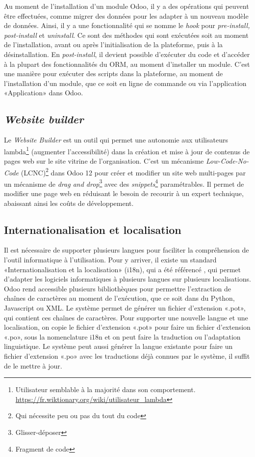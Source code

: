 Au moment de l’installation d’un module Odoo, il y a des opérations qui peuvent être effectuées, comme migrer des données pour les adapter à un nouveau modèle de données. Ainsi, il y a une fonctionnalité qui se nomme le \textit{hook} pour \textit{pre-install, post-install} et \textit{uninstall}. Ce sont des méthodes qui sont exécutées soit au moment de l’installation, avant ou après l’initialisation de la plateforme, puis à la désinstallation. En \textit{post-install}, il devient possible d’exécuter du code et d'accéder à la plupart des fonctionnalités du ORM, au moment d’installer un module. C’est une manière pour exécuter des scripts dans la plateforme, au moment de l’installation d’un module, que ce soit en ligne de commande ou via l’application «Application» dans Odoo.

\subsection{\textit{Website builder}}

Le \textit{Website Builder} est un outil qui permet une autonomie aux utilisateurs lambda\footnote{Utilisateur semblable à la majorité dans son comportement. \url{https://fr.wiktionary.org/wiki/utilisateur_lambda}} (augmenter l'accessibilité) dans la création et mise à jour de contenus de pages web sur le site vitrine de l'organisation. C’est un mécanisme \textit{Low-Code-No-Code} (LCNC)\footnote{Qui nécessite peu ou pas du tout du code} dans Odoo 12 pour créer et modifier un site web multi-pages par un mécanisme de \textit{drag and drop}\footnote{Glisser-déposer} avec des \textit{snippets}\footnote{Fragment de code} paramétrables. Il permet de modifier une page web en réduisant le besoin de recourir à un expert technique, abaissant ainsi les coûts de développement.

\subsection{Internationalisation et localisation}

Il est nécessaire de supporter plusieurs langues pour faciliter la compréhension de l'outil informatique à l'utilisation. Pour y arriver, il existe un standard «Internationalisation et la localisation» (i18n), qui a été référencé \cite{i18n_wiley}, qui permet d'adapter les logiciels informatiques à plusieurs langues sur plusieurs localisations\cite{wikipedia_i18n}. Odoo rend accessible plusieurs bibliothèques pour permettre l’extraction de chaînes de caractères au moment de l’exécution, que ce soit dans du Python, Javascript ou XML. Le système permet de générer un fichier d'extension «.pot», qui contient ces chaînes de caractères. Pour supporter une nouvelle langue et une localisation, on copie le fichier d'extension «.pot» pour faire un fichier d'extension «.po», sous la nomenclature i18n et on peut faire la traduction ou l’adaptation linguistique. Le système peut aussi générer la langue existante pour faire un fichier d'extension «.po» avec les traductions déjà connues par le système, il suffit de le mettre à jour.

